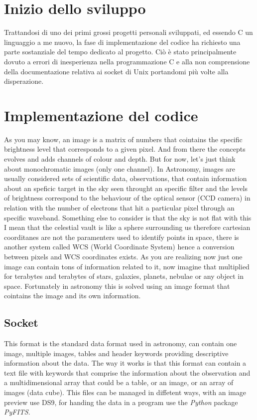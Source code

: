 \documentclass[11pt,fleqn]{book} %
\begin{document}
\section{Inizio dello sviluppo}
Trattandosi di uno dei primi grossi progetti personali sviluppati, ed essendo C un linguaggio a me nuovo, la fase di implementazione del codice ha richiesto una parte sostanziale del tempo dedicato al progetto.
Ciò è stato principalmente dovuto a errori di inesperienza nella programmazione C e alla non comprensione della documentazione relativa ai socket di Unix portandomi più volte alla disperazione.

\section{Implementazione del codice}
	As you may know, an image is a matrix of numbers that cointains the specific brightness level that corresponds to a given pixel. And from there the concepts evolves and adds channels of colour and depth. But for now, let's just think about monochromatic images (only one channel). In Astronomy, images are usually considered sets of scientific data, observations, that contain information about an speficic target in the sky seen throught an specific filter and the levels of brightness correspond to the behaviour of the optical sensor (CCD camera) in relation with the number of electrons that hit a particular pixel through an specific waveband. Something else to consider is that the sky is not flat with this I mean that the celestial vault is like a sphere surrounding us therefore cartesian coorditanes are not the paramenters used to identify points in space, there is another system called WCS (World Coordinate System) hence a conversion between pixels and WCS coordinates exists. As you are realizing now just one image can contain tons of information related to it, now imagine that multiplied for terabytes and terabytes of stars, galaxies, planets, nebulae or any object in space. Fortunately in astronomy this is solved using an image format that cointains the image and its own information.

\subsection{Socket}
    	This format is the standard data format used in astronomy, can contain one image, multiple images, tables and header keywords providing descriptive information about the data. The way it works is that this format can contain a text file with keywords that comprise the information about the observation and a multidimensional array that could be a table, or an image, or an array of images (data cube). This files can be managed in diffetent ways, with an image preview use DS9, for handing the data in a program use the \emph{Python} package \emph{PyFITS}.
        
\end{document}
